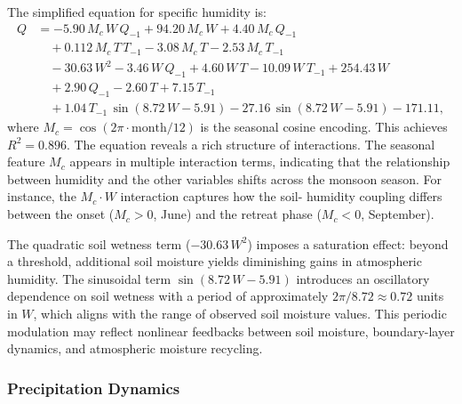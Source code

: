 \documentclass{article}
\begin{document}
The simplified equation for specific humidity is:
\begin{equation}
\begin{aligned}
Q &= -5.90\, M_c\, W\, Q_{-1} + 94.20\, M_c\, W + 4.40\, M_c\, Q_{-1} \\
  &\quad + 0.112\, M_c\, T\, T_{-1} - 3.08\, M_c\, T - 2.53\, M_c\, T_{-1} \\
  &\quad - 30.63\, W^2 - 3.46\, W\, Q_{-1} + 4.60\, W\, T - 10.09\, W\, T_{-1} + 254.43\, W \\
  &\quad + 2.90\, Q_{-1} - 2.60\, T + 7.15\, T_{-1} \\
  &\quad + 1.04\, T_{-1}\, \sin(8.72\, W - 5.91) - 27.16\, \sin(8.72\, W - 5.91) - 171.11,
\end{aligned}
\label{eq:Q}
\end{equation}
where $M_c = \cos(2\pi \cdot \text{month}/12)$ is the seasonal cosine encoding. This achieves $R^2 = 0.896$. The equation reveals a rich structure of interactions. The seasonal feature $M_c$ appears in multiple interaction terms, indicating that the relationship between humidity and the other variables shifts across the monsoon season. For instance, the $M_c \cdot W$ interaction captures how the soil- humidity coupling differs between the onset ($M_c > 0$, June) and the retreat phase ($M_c < 0$, September).

The quadratic soil wetness term ($-30.63\, W^2$) imposes a saturation effect: beyond a threshold, additional soil moisture yields diminishing gains in atmospheric humidity. The sinusoidal term $\sin(8.72\, W - 5.91)$ introduces an oscillatory dependence on soil wetness with a period of approximately $2\pi / 8.72 \approx 0.72$ units in $W$, which aligns with the range of observed soil moisture values. This periodic modulation may reflect nonlinear feedbacks between soil moisture, boundary-layer dynamics, and atmospheric moisture recycling.

\subsubsection{Precipitation Dynamics}
\end{document}
